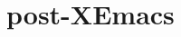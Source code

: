 \documentclass[format=acmsmall, review=false, screen=true]{acmart}
\begin{document}










\section{post-XEmacs}           %

\end{document}
